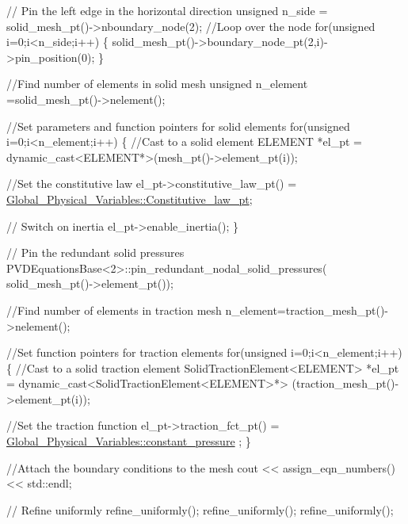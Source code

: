 \begin{DoxyCodeInclude}
 \textcolor{comment}{// Pin the left edge in the horizontal direction}
 \textcolor{keywordtype}{unsigned} n\_side = solid\_mesh\_pt()->nboundary\_node(2);
 \textcolor{comment}{//Loop over the node}
 \textcolor{keywordflow}{for}(\textcolor{keywordtype}{unsigned} i=0;i<n\_side;i++)
  \{
   solid\_mesh\_pt()->boundary\_node\_pt(2,i)->pin\_position(0);
  \}

 \textcolor{comment}{//Find number of elements in solid mesh}
 \textcolor{keywordtype}{unsigned} n\_element =solid\_mesh\_pt()->nelement();
  
 \textcolor{comment}{//Set parameters and function pointers for solid elements}
 \textcolor{keywordflow}{for}(\textcolor{keywordtype}{unsigned} i=0;i<n\_element;i++)
  \{
   \textcolor{comment}{//Cast to a solid element}
   ELEMENT *el\_pt = \textcolor{keyword}{dynamic\_cast<}ELEMENT*\textcolor{keyword}{>}(mesh\_pt()->element\_pt(i));

   \textcolor{comment}{//Set the constitutive law}
   el\_pt->constitutive\_law\_pt() =
    \hyperlink{namespaceGlobal__Physical__Variables_a2a37fb040c832ee7a086bb13bb02a100}{Global\_Physical\_Variables::Constitutive\_law\_pt};
   
   \textcolor{comment}{// Switch on inertia}
   el\_pt->enable\_inertia();
  \}

 \textcolor{comment}{// Pin the redundant solid pressures}
 PVDEquationsBase<2>::pin\_redundant\_nodal\_solid\_pressures(
  solid\_mesh\_pt()->element\_pt());

 \textcolor{comment}{//Find number of elements in traction mesh}
 n\_element=traction\_mesh\_pt()->nelement();
  
 \textcolor{comment}{//Set function pointers for traction elements}
 \textcolor{keywordflow}{for}(\textcolor{keywordtype}{unsigned} i=0;i<n\_element;i++)
  \{
   \textcolor{comment}{//Cast to a solid traction element}
   SolidTractionElement<ELEMENT> *el\_pt = 
    \textcolor{keyword}{dynamic\_cast<}SolidTractionElement<ELEMENT>*\textcolor{keyword}{>}
    (traction\_mesh\_pt()->element\_pt(i));

   \textcolor{comment}{//Set the traction function}
   el\_pt->traction\_fct\_pt() = \hyperlink{namespaceGlobal__Physical__Variables_a19f4e20a92e7d216b4d2b00308f96917}{Global\_Physical\_Variables::constant\_pressure}
      ;
  \}

 \textcolor{comment}{//Attach the boundary conditions to the mesh}
 cout << assign\_eqn\_numbers() << std::endl; 

 \textcolor{comment}{// Refine uniformly}
 refine\_uniformly();
 refine\_uniformly();
 refine\_uniformly();
 


\end{DoxyCodeInclude}
